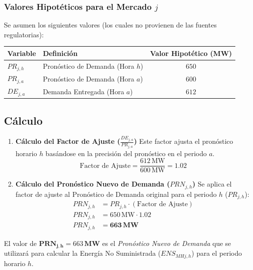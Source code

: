 \documentclass[a5paper]{book}%
\begin{document}
\subsubsection*{Valores Hipotéticos para el Mercado $j$}
Se asumen los siguientes valores (los cuales no provienen de las fuentes regulatorias):
\begin{center}
	\begin{tabular}{|l|l|c|}
		\hline
		\textbf{Variable} & \textbf{Definición} & \textbf{Valor Hipotético (MW)} \\
		\hline
		$PR_{j,h}$ & Pronóstico de Demanda (Hora $h$) & $650$ \\
		$PR_{j,a}$ & Pronóstico de Demanda (Hora $a$) & $600$ \\
		$DE_{j,a}$ & Demanda Entregada (Hora $a$) & $612$ \\
		\hline
	\end{tabular}
\end{center}

\subsection*{Cálculo}

\begin{enumerate}
	\item \textbf{Cálculo del Factor de Ajuste ($\frac{DE_{j,a}}{PR_{j,a}}$)}
	Este factor ajusta el pronóstico horario $h$ basándose en la precisión del pronóstico en el periodo $a$.
	\begin{equation*}
		\text{Factor de Ajuste} = \frac{612 \, \text{MW}}{600 \, \text{MW}} = 1.02
	\end{equation*}
	
	\item \textbf{Cálculo del Pronóstico Nuevo de Demanda ($PRN_{j,h}$)}
	Se aplica el factor de ajuste al Pronóstico de Demanda original para el periodo $h$ ($PR_{j,h}$):
	\begin{align*}
		PRN_{j,h} &= PR_{j,h} \cdot (\text{Factor de Ajuste}) \\
		PRN_{j,h} &= 650 \, \text{MW} \cdot 1.02 \\
		PRN_{j,h} &= \mathbf{663 \, \text{MW}}
	\end{align*}
\end{enumerate}

\vspace{0.5cm}

El valor de $\mathbf{PRN_{j,h}} = 663 \, \mathbf{MW}$ es el \textit{Pronóstico Nuevo de Demanda} que se utilizará para calcular la Energía No Suministrada ($ENS_{MHj,h}$) para el periodo horario $h$.\\\\
\end{document}
